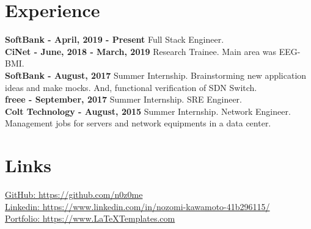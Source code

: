 \documentclass[10pt]{article} %
\begin{document}
\begin{paracol}{2}
\section{Experience}
\textbf{SoftBank - April, 2019 - Present}
Full Stack Engineer.\\

\textbf{CiNet - June, 2018 - March, 2019}
Research Trainee. Main area was EEG-BMI.\\

\textbf{SoftBank - August, 2017}
Summer Internship. Brainstorming new application ideas and make mocks. And, functional verification of SDN Switch.\\

\textbf{freee - September, 2017}
Summer Internship. SRE Engineer.\\

\textbf{Colt Technology - August, 2015}
Summer Internship. Network Engineer. Management jobs for servers and network equipments in a data center.\\

\section{Links}
{\faGithub} \href{https://github.com/n0z0me}{GitHub: https://github.com/n0z0me} \\ %
{\faLinkedinSquare} \href{https://www.linkedin.com/in/nozomi-kawamoto-41b296115/}{Linkedin: https://www.linkedin.com/in/nozomi-kawamoto-41b296115/} \\ %
{\small\faDesktop} \hspace{5mm} \href{https://www.LaTeXTemplates.com}{Portfolio: https://www.LaTeXTemplates.com} \\ %

\end{paracol}

\end{document}
